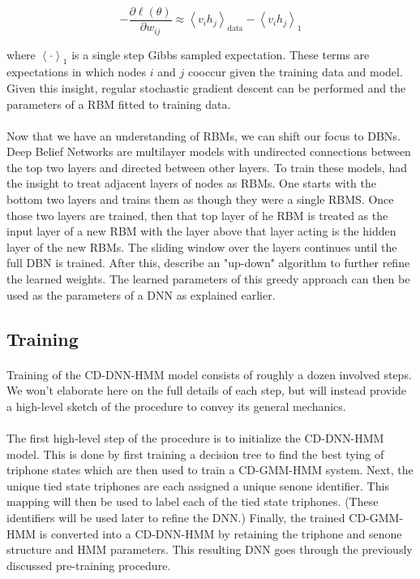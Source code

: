 \documentclass[letterpaper]{article}
\newcommand{\partialDx}[2]{\frac{\partial #1}{ \partial #2  }}
\newcommand{\inAngle}[1]{\left \langle #1 \right \rangle}
\begin{document}
\begin{equation}
	- \partialDx{\ell(\theta)}{w_{ij}} \approx \inAngle{ v_i h_j }_\text{data} - \inAngle{ v_i h_j }_\text{1}
\end{equation}

where $\inAngle{ \cdot }_\text{1}$ is a single step Gibbs sampled expectation. These terms are expectations in which nodes $i$ and $j$ cooccur given the training data and model. Given this insight, regular stochastic gradient descent can be performed and the parameters of a RBM fitted to training data.

\paragraph{} Now that we have an understanding of RBMs, we can shift our focus to DBNs. Deep Belief Networks are multilayer models with undirected connections between the top two layers and directed between other layers. To train these models, \cite{DBLP:journals/neco/HintonOT06} had the insight to treat adjacent layers of nodes as RBMs. One starts with the bottom two layers and trains them as though they were a single RBMS. Once those two layers are trained, then that top layer of he RBM is treated as the input layer of a new RBM with the layer above that layer acting is the hidden layer of the new RBMs. The sliding window over the layers continues until the full DBN is trained.  After this, \cite{DBLP:journals/neco/HintonOT06} describe an "up-down" algorithm to further refine the learned weights. The learned parameters of this greedy approach can then be used as the parameters of a DNN as explained earlier.

\subsection*{Training}

\paragraph{} Training of the CD-DNN-HMM model consists of roughly a dozen involved steps. We won't elaborate here on the full details of each step, but will instead provide a high-level sketch of the procedure to convey its general mechanics. 

\paragraph{} The first high-level step of the procedure is to initialize the CD-DNN-HMM model. This is done by first training a decision tree to find the best tying of triphone states which are then used to train a CD-GMM-HMM system. Next, the unique tied state triphones are each assigned a unique senone identifier. This mapping will then be used to label each of the tied state triphones. (These identifiers will be used later to refine the DNN.) Finally, the trained CD-GMM-HMM is converted into a CD-DNN-HMM by retaining the triphone and senone structure and HMM parameters. This resulting DNN goes through the previously discussed pre-training procedure.
\end{document}
